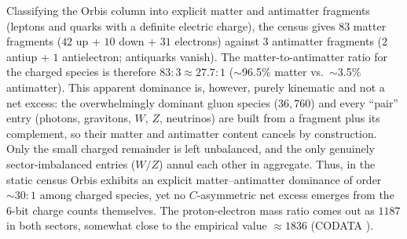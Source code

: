 \documentclass{ijuc}
\begin{document}
Classifying the Orbis column into explicit matter and antimatter fragments (leptons and quarks with a definite electric charge), the census gives $83$ matter fragments ($42$ up + $10$ down + $31$ electrons) against $3$ antimatter fragments ($2$ antiup + $1$ antielectron; antiquarks vanish). The matter-to-antimatter ratio for the charged species is therefore $83{:}3\approx27.7{:}1$ ($\sim$96.5\% matter vs.\ $\sim$3.5\% antimatter). This apparent dominance is, however, purely kinematic and not a net excess: the overwhelmingly dominant gluon species ($36{,}760$) and every ``pair'' entry (photons, gravitons, $W$, $Z$, neutrinos) are built from a fragment plus its complement, so their matter and antimatter content cancels by construction. Only the small charged remainder is left unbalanced, and the only genuinely sector-imbalanced entries ($W/Z$) annul each other in aggregate. Thus, in the static census Orbis exhibits an explicit matter--antimatter dominance of order $\sim30:1$ among charged species, yet no $C$-asymmetric net excess emerges from the $6$-bit charge counts themselves.
The proton-electron mass ratio comes out as $1187$ in both sectors, somewhat close to the empirical value $\approx1836$ (CODATA \cite{codata}). 
\end{document}
